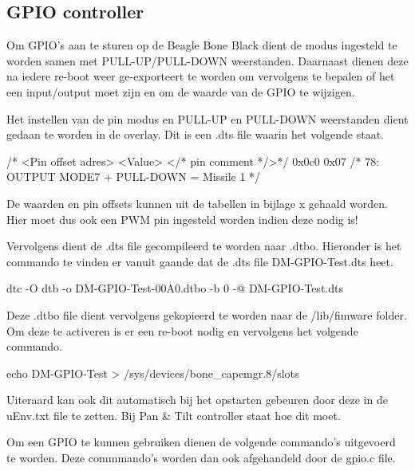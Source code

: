 \subsection{GPIO controller}
\label{sec:gpio}

Om GPIO's aan te sturen op de Beagle Bone Black dient de modus ingesteld te worden
samen met PULL-UP/PULL-DOWN weerstanden. Daarnaast dienen deze na iedere re-boot
weer ge-exporteert te worden om vervolgens te bepalen of het een input/output moet
zijn en om de waarde van de GPIO te wijzigen.

Het instellen van de pin modus en PULL-UP en PULL-DOWN weerstanden dient gedaan te
worden in de overlay. Dit is een .dts file waarin het volgende staat.

\begin{cppcode}
/* <Pin offset adres> <Value> </* pin comment */>*/
          0x0c0        0x07    /* 78: OUTPUT MODE7 + PULL-DOWN = Missile 1     */
\end{cppcode}

De waarden en pin offsets kunnen uit de tabellen in bijlage x gehaald worden. Hier
moet dus ook een PWM pin ingesteld worden indien deze nodig is!

Vervolgens dient de .dts file gecompileerd te worden naar .dtbo. Hieronder is het
commando te vinden er vanuit gaande dat de .dts file DM-GPIO-Test.dts heet.

\begin{cppcode}
dtc -O dtb -o DM-GPIO-Test-00A0.dtbo -b 0 -@ DM-GPIO-Test.dts
\end{cppcode}

Deze .dtbo file dient vervolgens gekopieerd te worden naar de /lib/fimware folder.
Om deze te activeren is er een re-boot nodig en vervolgens het volgende commando.

\begin{cppcode}
echo DM-GPIO-Test > /sys/devices/bone_capemgr.8/slots
\end{cppcode}

Uiteraard kan ook dit automatisch bij het opstarten gebeuren door deze in de
uEnv.txt file te zetten. Bij Pan \& Tilt controller staat hoe dit moet.

Om een GPIO te kunnen gebruiken dienen de volgende commando's uitgevoerd te worden.
Deze commmando's worden dan ook afgehandeld door de gpio.c file.

